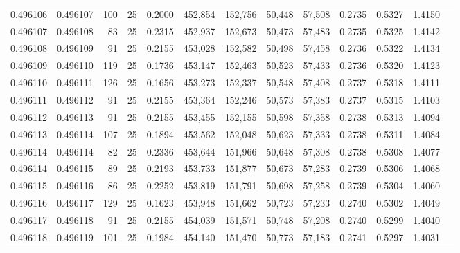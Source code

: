 \begin{tabular}{rrrrrrrrrrrrr}
0.496106 & 0.496107 &   100 &  25 &                                     0.2000 & 452,854 & 152,756 &  50,448 &  57,508 & 0.2735 & 0.5327 & 1.4150 \\
0.496107 & 0.496108 &    83 &  25 &                                     0.2315 & 452,937 & 152,673 &  50,473 &  57,483 & 0.2735 & 0.5325 & 1.4142 \\
0.496108 & 0.496109 &    91 &  25 &                                     0.2155 & 453,028 & 152,582 &  50,498 &  57,458 & 0.2736 & 0.5322 & 1.4134 \\
0.496109 & 0.496110 &   119 &  25 &                                     0.1736 & 453,147 & 152,463 &  50,523 &  57,433 & 0.2736 & 0.5320 & 1.4123 \\
0.496110 & 0.496111 &   126 &  25 &                                     0.1656 & 453,273 & 152,337 &  50,548 &  57,408 & 0.2737 & 0.5318 & 1.4111 \\
0.496111 & 0.496112 &    91 &  25 &                                     0.2155 & 453,364 & 152,246 &  50,573 &  57,383 & 0.2737 & 0.5315 & 1.4103 \\
0.496112 & 0.496113 &    91 &  25 &                                     0.2155 & 453,455 & 152,155 &  50,598 &  57,358 & 0.2738 & 0.5313 & 1.4094 \\
0.496113 & 0.496114 &   107 &  25 &                                     0.1894 & 453,562 & 152,048 &  50,623 &  57,333 & 0.2738 & 0.5311 & 1.4084 \\
0.496114 & 0.496114 &    82 &  25 &                                     0.2336 & 453,644 & 151,966 &  50,648 &  57,308 & 0.2738 & 0.5308 & 1.4077 \\
0.496114 & 0.496115 &    89 &  25 &                                     0.2193 & 453,733 & 151,877 &  50,673 &  57,283 & 0.2739 & 0.5306 & 1.4068 \\
0.496115 & 0.496116 &    86 &  25 &                                     0.2252 & 453,819 & 151,791 &  50,698 &  57,258 & 0.2739 & 0.5304 & 1.4060 \\
0.496116 & 0.496117 &   129 &  25 &                                     0.1623 & 453,948 & 151,662 &  50,723 &  57,233 & 0.2740 & 0.5302 & 1.4049 \\
0.496117 & 0.496118 &    91 &  25 &                                     0.2155 & 454,039 & 151,571 &  50,748 &  57,208 & 0.2740 & 0.5299 & 1.4040 \\
0.496118 & 0.496119 &   101 &  25 &                                     0.1984 & 454,140 & 151,470 &  50,773 &  57,183 & 0.2741 & 0.5297 & 1.4031 \\

\end{tabular}
